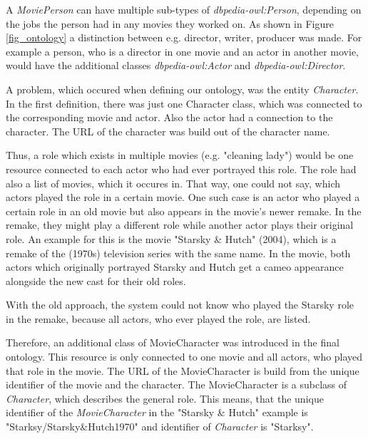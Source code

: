 A \textit{MoviePerson} can have multiple sub-types of \textit{dbpedia-owl:Person}, depending on the jobs the person had in any movies they worked on.
As shown in Figure \ref{fig_ontology} a distinction between e.g. director, writer, producer was made.
For example a person, who is a director in one movie and an actor in another movie, would have the additional classes \textit{dbpedia-owl:Actor} and \textit{dbpedia-owl:Director}.

A problem, which occured when defining our ontology, was the entity \textit{Character}.
In the first definition, there was just one Character class, which was connected to the corresponding movie and actor.
Also the actor had a connection to the character.
The URL of the character was build out of the character name.

Thus, a role which exists in multiple movies (e.g. "cleaning lady") would be one resource connected to each actor who had ever portrayed this role.
The role had also a list of movies, which it occures in.
That way, one could not say, which actors played the role in a certain movie.
One such case is an actor who played a certain role in an old movie but also appears in the movie's newer remake.
In the remake, they might play a different role while another actor plays their original role.
An example for this is the movie "Starsky \& Hutch" (2004), which is a remake of the (1970s) television series with the same name.
In the movie, both actors which originally portrayed Starsky and Hutch get a cameo appearance alongside the new cast for their old roles.

With the old approach, the system could not know who played the Starsky role in the remake, because all actors, who ever played the role, are listed.

Therefore, an additional class of MovieCharacter was introduced in the final ontology.
This resource is only connected to one movie and all actors, who played that role in the movie.
The URL of the MovieCharacter is build from the unique identifier of the movie and the character.
The MovieCharacter is a subclass of \textit{Character}, which describes the general role.
This means, that the unique identifier of the \textit{MovieCharacter} in the "Starsky \& Hutch" example is "Starksy/Starsky\&Hutch1970" and identifier of \textit{Character} is "Starksy".

